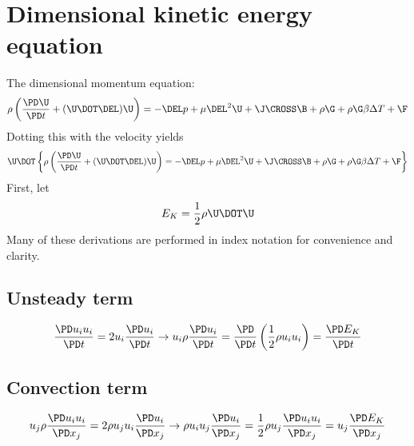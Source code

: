 \documentclass[11pt]{article}
\begin{document}
\doublespacing
\MOONSTITLE
\maketitle

\section{Dimensional kinetic energy equation}
The dimensional momentum equation:
\begin{equation}
	\rho \left( \frac{\PD \U}{\PD t} + (\U \DOT \DEL) \U \right) =
	-\DEL p + \mu \DEL^2 \U + \J \CROSS \B + \rho \G + \rho \G \beta \Delta T + \F
\end{equation}
Dotting this with the velocity yields
\begin{equation}
	\U \DOT \left\{ \rho \left( \frac{\PD \U}{\PD t} + (\U \DOT \DEL) \U \right) =
	-\DEL p + \mu \DEL^2 \U + \J \CROSS \B + \rho \G + \rho \G \beta \Delta T + \F \right\}
\end{equation}
First, let
\begin{equation}
	E_K = \frac{1}{2} \rho \U \DOT \U
\end{equation}
Many of these derivations are performed in index notation for convenience and clarity.
\subsection{Unsteady term}
\begin{equation}
	\frac{\PD u_i u_i}{\PD t} =
	2 u_i \frac{\PD u_i}{\PD t}
	\rightarrow
	u_i \rho \frac{\PD u_i}{\PD t} =
	\frac{\PD}{\PD t} \left( \frac{1}{2} \rho u_i u_i \right) =
	\frac{\PD E_K}{\PD t}
\end{equation}

\subsection{Convection term}
\begin{equation}
	u_j \rho \frac{\PD u_i u_i}{\PD x_j} =
	2 \rho u_j u_i \frac{\PD u_i}{\PD x_j}
	\rightarrow
	\rho u_i u_j \frac{\PD u_i}{\PD x_j} =
	\frac{1}{2} \rho u_j \frac{\PD u_i u_i}{\PD x_j}
	= u_j \frac{\PD E_K}{\PD x_j}
\end{equation}
\end{document}
